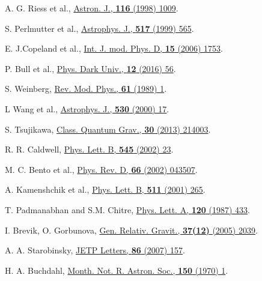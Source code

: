 

\begin{thebibliography}{90}

 A. G. Riess et al., \href{https://doi.org/10.1086/300499}{Astron. J., \textbf{116} (1998) 1009}.

 S. Perlmutter et al., \href{https://doi.org/10.1086/307221} {Astrophys. J., \textbf{517} (1999) 565}.

 E. J.Copeland et al., \href{https://doi.org/10.1142/S021827180600942X}{Int. J. mod. Phys. D, \textbf{15} (2006) 1753}. 

 P. Bull et al., \href{10.1016/j.dark.2016.02.001}{Phys. Dark Univ., \textbf{12} (2016) 56}.

 S. Weinberg, \href{10.1103/RevModPhys.61.1}{Rev. Mod. Phys., \textbf{61} (1989) 1}.

 L Wang et al., \href{https://doi.org/10.1086/308331}{Astrophys. J.,\textbf{ 530 }(2000) 17}.

 S. Tsujikawa, \href{https://doi.org/10.1088/0264-9381/30/21/214003}{Class. Quantum Grav., \textbf{30} (2013) 214003}.

 R. R. Caldwell, \href{https://doi.org/10.1016/S0370-2693(02)02589-3}{Phys. Lett. B, \textbf{545} (2002) 23}. 

 M. C. Bento et al., \href{https://doi.org/10.1103/PhysRevD.66.043507} {Phys. Rev. D, \textbf{66} (2002) 043507}.

 A. Kamenshchik et al., \href{https://doi.org/10.1016/S0370-2693(01)00571-8}{Phys. Lett. B, \textbf{511} (2001) 265}. 

 T. Padmanabhan and S.M. Chitre, \href{https://ui.adsabs.harvard.edu/abs/1987PhLA..120..433P}{Phys. Lett. A, \textbf{120} (1987) 433}.

 I. Brevik, O. Gorbunova, \href{https://doi.org/10.1007/s10714-005-0178-9}{Gen. Relativ. Gravit., \textbf{37(12)} (2005) 2039}.

 A. A. Starobinsky, \href{https://doi.org/10.1134/S0021364007150027}{JETP Letters, \textbf{86} (2007) 157}.

 H. A. Buchdahl, \href{https://ui.adsabs.harvard.edu/abs/1970MNRAS.150....1B}{Month. Not. R. Astron. Soc., \textbf{150} (1970) 1}. 


\end{thebibliography}
